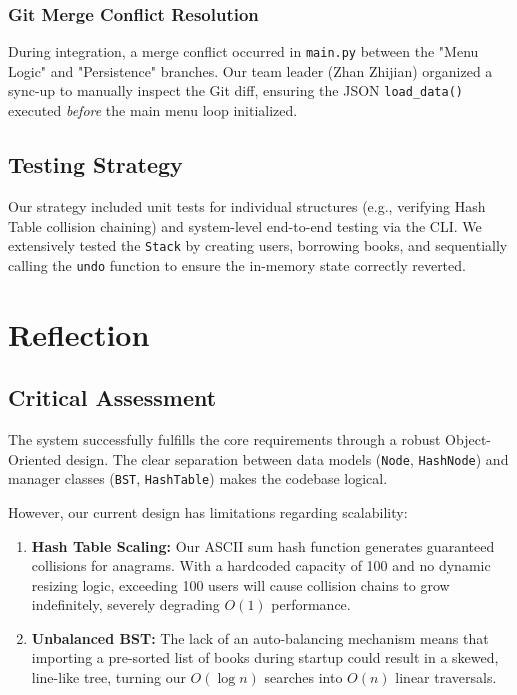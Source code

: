 \documentclass[11pt,a4paper]{article}
\begin{document}
\subsubsection{Git Merge Conflict Resolution}
During integration, a merge conflict occurred in \texttt{main.py} between the "Menu Logic" and "Persistence" branches. Our team leader (Zhan Zhijian) organized a sync-up to manually inspect the Git diff, ensuring the JSON \texttt{load\_data()} executed \textit{before} the main menu loop initialized.

\subsection{Testing Strategy}
Our strategy included unit tests for individual structures (e.g., verifying Hash Table collision chaining) and system-level end-to-end testing via the CLI. We extensively tested the \texttt{Stack} by creating users, borrowing books, and sequentially calling the \texttt{undo} function to ensure the in-memory state correctly reverted.

\section{Reflection}
\label{sec:reflection}

\subsection{Critical Assessment}
The system successfully fulfills the core requirements through a robust Object-Oriented design. The clear separation between data models (\texttt{Node}, \texttt{HashNode}) and manager classes (\texttt{BST}, \texttt{HashTable}) makes the codebase logical. 

However, our current design has limitations regarding scalability:
\begin{enumerate}
    \item \textbf{Hash Table Scaling:} Our ASCII sum hash function generates guaranteed collisions for anagrams. With a hardcoded capacity of 100 and no dynamic resizing logic, exceeding 100 users will cause collision chains to grow indefinitely, severely degrading $O(1)$ performance.
    \item \textbf{Unbalanced BST:} The lack of an auto-balancing mechanism means that importing a pre-sorted list of books during startup could result in a skewed, line-like tree, turning our $O(\log n)$ searches into $O(n)$ linear traversals.
\end{enumerate}
\end{document}
